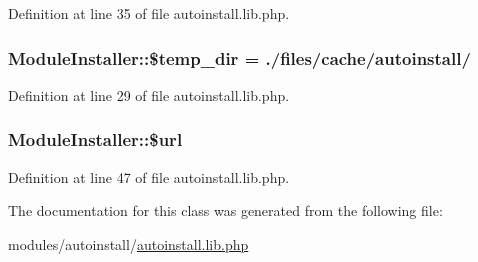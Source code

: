 Definition at line 35 of file autoinstall.\+lib.\+php.

\hypertarget{classModuleInstaller_a65850d513e6f6fdae18ee0654efb956c}{}
\subsubsection[{\$temp\+\_\+dir}]{\setlength{\rightskip}{0pt plus 5cm}Module\+Installer\+::\$temp\+\_\+dir = \textquotesingle{}./files/cache/{\bf autoinstall}/\textquotesingle{}}\label{classModuleInstaller_a65850d513e6f6fdae18ee0654efb956c}


Definition at line 29 of file autoinstall.\+lib.\+php.

\hypertarget{classModuleInstaller_a01a6bf5f232c00fff146a58fb8c14b84}{}
\subsubsection[{\$url}]{\setlength{\rightskip}{0pt plus 5cm}Module\+Installer\+::\$url}\label{classModuleInstaller_a01a6bf5f232c00fff146a58fb8c14b84}


Definition at line 47 of file autoinstall.\+lib.\+php.



The documentation for this class was generated from the following file\+:\begin{DoxyCompactItemize}
\item 
modules/autoinstall/\hyperlink{autoinstall_8lib_8php}{autoinstall.\+lib.\+php}\end{DoxyCompactItemize}
